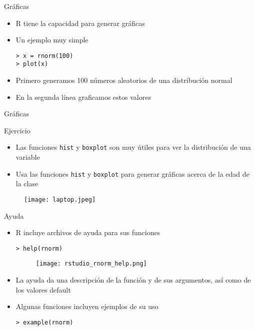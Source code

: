 \documentclass{beamer}
\begin{document}
\begin{frame}[fragile]{Gráficas}
\begin{itemize}
\item R tiene la capacidad para generar gráficas
\item Un ejemplo muy simple
\begin{verbatim}
> x = rnorm(100)
> plot(x)
\end{verbatim}
\item Primero generamos 100 números aleatorios de una distribución normal
\item En la segunda línea graficamos estos valores
\end{itemize}
\end{frame}

\begin{frame}[fragile]{Gráficas}
\begin{block}{Ejercicio}
\begin{itemize}
\item Las funciones \verb=hist= y \verb=boxplot= son muy útiles para ver la distribución de una variable
\item Usa las funciones \verb=hist= y \verb=boxplot= para generar gráficas acerca de la edad de la clase
\end{itemize}
\end{block}
\begin{figure}[H]
\centering
\texttt{[image: laptop.jpeg]}
\end{figure}
\end{frame}


\begin{frame}[fragile]{Ayuda}
\begin{itemize}
\item R incluye archivos de ayuda para sus funciones
\begin{verbatim}
> help(rnorm)
\end{verbatim}
\begin{figure}[H]
\centering
\texttt{[image: rstudio\_rnorm\_help.png]}
\end{figure}
\item La ayuda da una descripción de la función y de sus argumentos, así como de los valores default
\item Algunas funciones incluyen ejemplos de su uso
\begin{verbatim}
> example(rnorm)
\end{verbatim}
\end{itemize}
\end{frame}
\end{document}
